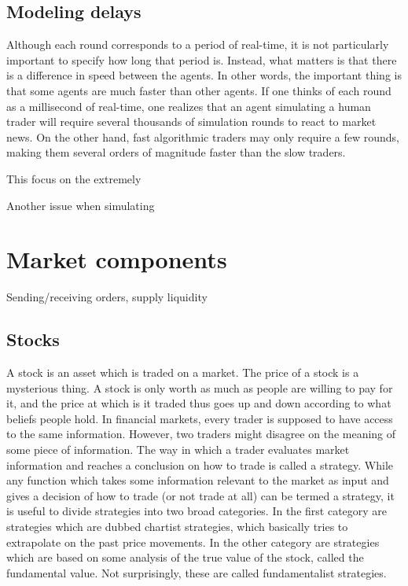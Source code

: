 \subsection{Modeling delays}

Although each round corresponds to a period of real-time, it is not particularly important to specify how long that period is. Instead, what matters is that there is a difference in speed between the agents. In other words, the important thing is that some agents are much faster than other agents. If one thinks of each round as a millisecond of real-time, one realizes that an agent simulating a human trader will require several thousands of simulation rounds to react to market news. On the other hand, fast algorithmic traders may only require a few rounds, making them several orders of magnitude faster than the slow traders. 

This focus on the extremely 

Another issue when simulating 





\section{Market components}
Sending/receiving orders, supply liquidity

\subsection{Stocks}
A stock is an asset which is traded on a market. The price of a stock is a mysterious thing. A stock is only worth as much as people are willing to pay for it, and the price at which is it traded thus goes up and down according to what beliefs people hold. In financial markets, every trader is supposed to have access to the same information. However, two traders might disagree on the meaning of some piece of information. The way in which a trader evaluates market information and reaches a conclusion on how to trade is called a strategy. While any function which takes some information relevant to the market as input and gives a decision of how to trade (or not trade at all) can be termed a strategy, it is useful to divide strategies into two broad categories. In the first category are strategies which are dubbed chartist strategies, which basically tries to extrapolate on the past price movements. In the other category are strategies which are based on some analysis of the true value of the stock, called the fundamental value. Not surprisingly, these are called fundamentalist strategies. 

